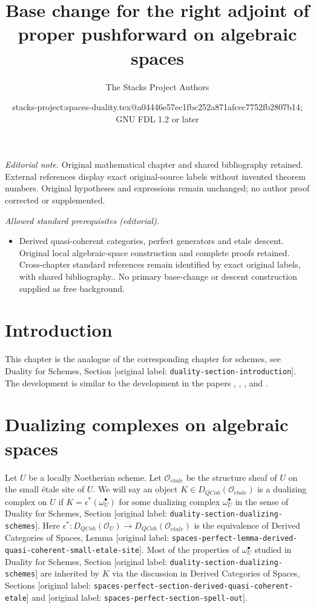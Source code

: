 \documentclass[10pt,a4paper]{article}
\title{Base change for the right adjoint of proper pushforward on algebraic spaces}
\author{The Stacks Project Authors}
\date{stacks-project:spaces-duality.tex@a04446e57ec1fbc252a871afcec7752fb2807b14; GNU FDL 1.2 or later}
\theoremstyle{plain}
\theoremstyle{definition}
\theoremstyle{remark}
\numberwithin{equation}{subsection}
\def\etale{{\acute{e}tale}}
\def\QCoh{\mathit{QCoh}}
\begin{document}
\maketitle
\noindent\textit{Editorial note.} Original mathematical chapter and shared bibliography retained. External references display exact original-source labels without invented theorem numbers. Original hypotheses and expressions remain unchanged; no author proof corrected or supplemented.\par\medskip
\noindent\textit{Allowed standard prerequisites (editorial).}\begin{itemize}
\item Derived quasi-coherent categories, perfect generators and etale descent. Original local algebraic-space construction and complete proofs retained. Cross-chapter standard references remain identified by exact original labels, with shared bibliography.. No primary base-change or descent construction supplied as free background.
\end{itemize}\medskip
\section{Introduction}
\label{section-introduction}

\noindent
This chapter is the analogue of the corresponding chapter for
schemes, see Duality for Schemes, Section \textnormal{[original label: \nolinkurl{duality-section-introduction}]}.
The development is similar to the development in the papers
\cite{Neeman-Grothendieck}, \cite{LN},
\cite{Lipman-notes}, and \cite{Neeman-improvement}.




\section{Dualizing complexes on algebraic spaces}
\label{section-dualizing-spaces}

\noindent
Let $U$ be a locally Noetherian scheme. Let $\mathcal{O}_\etale$
be the structure sheaf of $U$ on the small \'etale site of $U$.
We will say an object $K \in D_\QCoh(\mathcal{O}_\etale)$ is
a dualizing complex on $U$ if $K = \epsilon^*(\omega_U^\bullet)$
for some dualizing complex $\omega_U^\bullet$ in the sense of
Duality for Schemes, Section \textnormal{[original label: \nolinkurl{duality-section-dualizing-schemes}]}.
Here $\epsilon^* : D_\QCoh(\mathcal{O}_U) \to D_\QCoh(\mathcal{O}_\etale)$
is the equivalence of Derived Categories of Spaces, Lemma
\textnormal{[original label: \nolinkurl{spaces-perfect-lemma-derived-quasi-coherent-small-etale-site}]}.
Most of the properties of $\omega_U^\bullet$ studied in
Duality for Schemes, Section \textnormal{[original label: \nolinkurl{duality-section-dualizing-schemes}]}
are inherited by $K$ via the discussion in
Derived Categories of Spaces, Sections
\textnormal{[original label: \nolinkurl{spaces-perfect-section-derived-quasi-coherent-etale}]} and
\textnormal{[original label: \nolinkurl{spaces-perfect-section-spell-out}]}.
\end{document}
